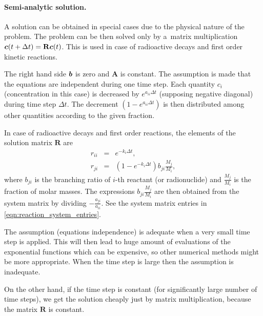 \paragraph{Semi-analytic solution.}
A  solution can be obtained in special cases due to the physical nature of the problem.
The problem can be then solved only by a~matrix multiplication $\mathbf{\boldsymbol{c}}(t+\Delta t) = \mathbf{R} \mathbf{\boldsymbol{c}}(t)$. 
This is used in case of radioactive decays and first order kinetic reactions.

The right hand side $\mathbf{\boldsymbol{b}}$ is zero and $\mathbf{A}$ is constant. The assumption is made that the equations 
are independent during one time step. Each quantity $c_i$ (concentration in this case) is decreased 
by $e^{a_{ii} \Delta t}$ (supposing negative diagonal) during time step $\Delta t$. The decrement $\left( 1-e^{a_{ii} \Delta t} \right)$
is then distributed among other quantities according to the given fraction.

In case of radioactive decays and first order reactions, the elements of the solution matrix $\mathbf{R}$ are
\begin{eqnarray*}
     r_{ii} &=& e^{-k_i \Delta t}, \\
     r_{ji} &=& \left( 1-e^{-k_i \Delta t} \right) b_{ji} \frac{M_j}{M_i},
\end{eqnarray*}
where $b_{ji}$ is the branching ratio of $i$-th reactant (or radionuclide) and $\frac{M_j}{M_i}$ is 
the fraction of molar masses.
The expressions $b_{ji} \frac{M_j}{M_i}$ are then obtained from the system matrix by dividing 
$-\frac{a_{ji}}{a_{ii}}$. See the system matrix entries in \eqref{eqn:reaction_system_entries}.

The assumption (equations independence) is adequate when a very small time step is applied. This will then lead 
to huge amount of evaluations of the exponential functions which can be expensive, so other numerical methods 
might be more appropriate. When the time step is large then the assumption is inadequate.

On the other hand, if the time step is constant (for significantly large number of time steps), we get the
solution cheaply just by matrix multiplication, because the matrix $\mathbf{R}$ is constant.


